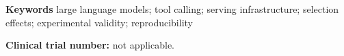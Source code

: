 \vspace{0.6em}
\noindent
\textbf{Keywords} large language models; tool calling; serving infrastructure; selection effects;
experimental validity; reproducibility

\vspace{0.5em}
\noindent
\textbf{Clinical trial number:} not applicable.
